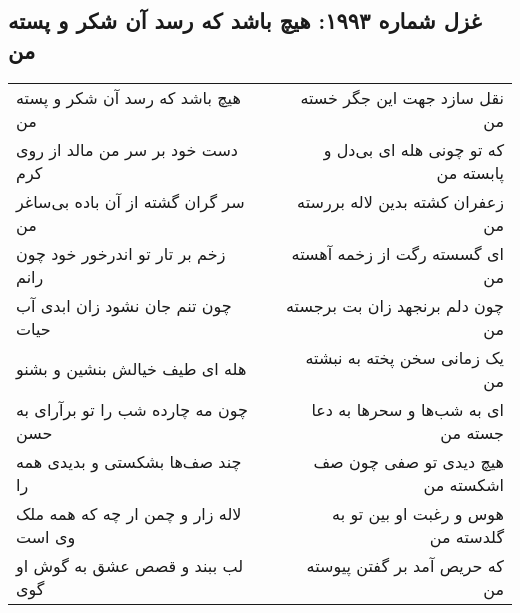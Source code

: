 \begin{center}
\section*{غزل شماره ۱۹۹۳: هیچ باشد که رسد آن شکر و پسته من}
\label{sec:1993}
\begin{longtable}{l p{0.5cm} r}
هیچ باشد که رسد آن شکر و پسته من
&&
نقل سازد جهت این جگر خسته من
\\
دست خود بر سر من مالد از روی کرم
&&
که تو چونی هله ای بی‌دل و پابسته من
\\
سر گران گشته از آن باده بی‌ساغر من
&&
زعفران کشته بدین لاله بررسته من
\\
زخم بر تار تو اندرخور خود چون رانم
&&
ای گسسته رگت از زخمه آهسته من
\\
چون تنم جان نشود زان ابدی آب حیات
&&
چون دلم برنجهد زان بت برجسته من
\\
هله ای طیف خیالش بنشین و بشنو
&&
یک زمانی سخن پخته به نبشته من
\\
چون مه چارده شب را تو برآرای به حسن
&&
ای به شب‌ها و سحرها به دعا جسته من
\\
چند صف‌ها بشکستی و بدیدی همه را
&&
هیچ دیدی تو صفی چون صف اشکسته من
\\
لاله زار و چمن ار چه که همه ملک وی است
&&
هوس و رغبت او بین تو به گلدسته من
\\
لب ببند و قصص عشق به گوش او گوی
&&
که حریص آمد بر گفتن پیوسته من
\\
\end{longtable}
\end{center}
